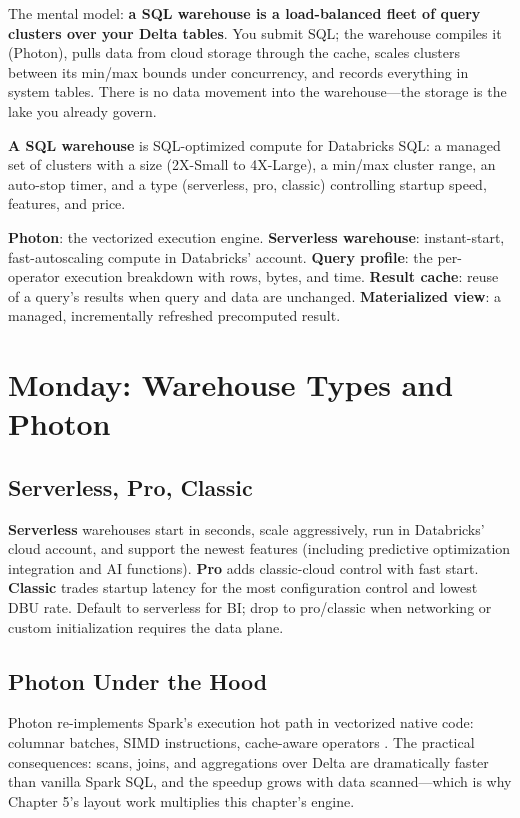 The mental model: \textbf{a SQL warehouse is a load-balanced fleet of query clusters over your Delta tables}. You submit SQL; the warehouse compiles it (Photon), pulls data from cloud storage through the cache, scales clusters between its min/max bounds under concurrency, and records everything in system tables. There is no data movement into the warehouse---the storage is the lake you already govern.

\begin{definitionbox}
\textbf{A SQL warehouse} is SQL-optimized compute for Databricks SQL: a managed set of clusters with a size (2X-Small to 4X-Large), a min/max cluster range, an auto-stop timer, and a type (serverless, pro, classic) controlling startup speed, features, and price.
\end{definitionbox}

\begin{keyterms}
\textbf{Photon}: the vectorized execution engine. \textbf{Serverless warehouse}: instant-start, fast-autoscaling compute in Databricks' account. \textbf{Query profile}: the per-operator execution breakdown with rows, bytes, and time. \textbf{Result cache}: reuse of a query's results when query and data are unchanged. \textbf{Materialized view}: a managed, incrementally refreshed precomputed result.
\end{keyterms}

\section{Monday: Warehouse Types and Photon}
\subsection{Serverless, Pro, Classic}
\textbf{Serverless} warehouses start in seconds, scale aggressively, run in Databricks' cloud account, and support the newest features (including predictive optimization integration and AI functions). \textbf{Pro} adds classic-cloud control with fast start. \textbf{Classic} trades startup latency for the most configuration control and lowest DBU rate. Default to serverless for BI; drop to pro/classic when networking or custom initialization requires the data plane.

\subsection{Photon Under the Hood}
Photon re-implements Spark's execution hot path in vectorized native code: columnar batches, SIMD instructions, cache-aware operators \cite{databricksPhoton}. The practical consequences: scans, joins, and aggregations over Delta are dramatically faster than vanilla Spark SQL, and the speedup grows with data scanned---which is why Chapter 5's layout work multiplies this chapter's engine.

